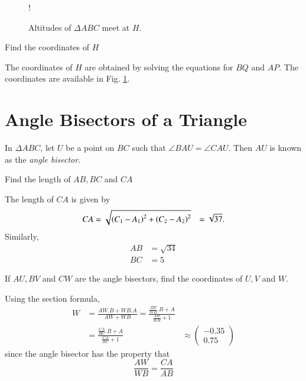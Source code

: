 \documentclass[journal,12pt,twocolumn]{IEEEtran}
\begin{document}

\begin{figure}[!h]
\centering
\resizebox {\columnwidth} {!} {

}
\caption{Altitudes of $\Delta ABC$ meet at $H$.}
\label{fig:altitude_def}
\end{figure}
%
\begin{problem}
Find the coordinates of $H$
\end{problem}
\solution The coordinates of $H$ are obtained by solving the equations for $BQ$ and $AP$. The coordinates are available in
Fig. \ref{fig:altitude_def}.
\section{Angle Bisectors of a Triangle}
%
\begin{definition}
In $\Delta ABC$, let $U$ be a point on $BC$ such that $\angle BAU = \angle CAU$. Then $AU$ is known as the {\em angle bisector}.
\end{definition}
\begin{problem}
Find the length of $AB,BC$ and $CA$
\end{problem}
\solution The length of $CA$ is given by
\begin{align}
CA &= \sqrt{\left(C_1-A_1\right)^2 + \left(C_2 - A_2\right)^2}
&= \sqrt{37}.
\end{align}
Similarly,
\begin{align}
AB & = \sqrt{34}
\\
BC & = 5
\end{align}
\begin{problem}
If $AU,BV$ and $CW$ are the angle bisectors, find the coordinates of $U,V$ and $W$.
\end{problem}
\solution Using the section formula,
\begin{align}
W &= \frac{AW.B+WB.A}{AW + WB} = \frac{\frac{AW}{WB}.B+A}{\frac{AW}{WB} + 1}
\\
&= \frac{\frac{CA}{BC}.B+A}{\frac{CA}{BC} + 1}
& \approx 
\begin{pmatrix}
-0.35
\\
0.75
\end{pmatrix} 
\end{align}
since the angle bisector has the property that
%
\begin{equation}
\frac{AW}{WB} = \frac{CA}{AB}
\end{equation}
\end{document}
